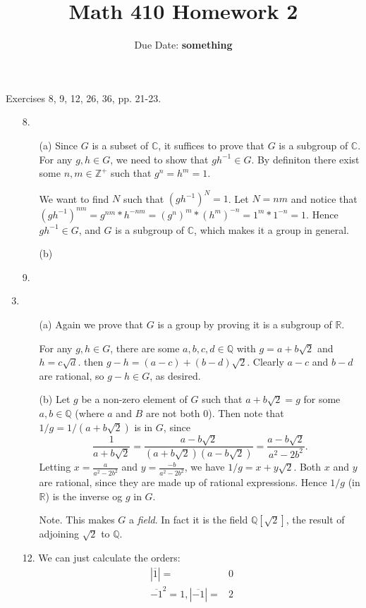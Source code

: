 \documentclass{article}
\title{\textbf{Math 410 Homework 2}}
\author{Due Date: \textbf{something}}
\date{}
\begin{document}
\maketitle

Exercises 8, 9, 12, 26, 36, pp. 21-23.

\begin{enumerate}
    \item [8.] 
    \begin{enumerate}
        \item [(a)] Since $G$ is a subset of $\mathbb C$, it suffices to prove that $G$ is a subgroup of $\mathbb C$. For any $g, h \in G$, we need to show that $gh^{-1} \in G$. By definiton there exist some $n, m \in \mathbb Z^+$ such that $g^n = h^m = 1$. 
        
        We want to find $N$ such that $(gh^{-1})^N = 1$. Let $N = nm$ and notice that $(gh^{-1})^{nm} = g^{nm} * h^{-nm} = (g^n)^m * (h^m)^{-n} = 1^m * 1 ^{-n} = 1$. Hence $gh^{-1} \in G$, and $G$ is a subgroup of $\mathbb C$, which makes it a group in general.
        \item [(b)] 
    \end{enumerate}

    \item [9.]
    \item \begin{enumerate}
        \item [(a)] Again we prove that $G$ is a group by proving it is a subgroup of $\mathbb R$. 
        
        For any $g, h \in G$, there are some $a, b, c, d \in \mathbb Q$ with $g = a + b \sqrt 2$ and $h = c \sqrt d$. then $g - h = (a - c) + (b - d)\sqrt 2$. Clearly $a - c$ and $b - d$ are rational, so $g - h \in G$, as desired. 

        \item [(b)] Let $g$ be a non-zero element of $G$ such that $a + b \sqrt 2 = g$ for some $a, b \in \mathbb Q$ (where $a$ and $B$ are not both $0$). Then note that $1 / g = 1 / (a + b \sqrt 2)$ is in $G$, since \[\frac 1 {a + b \sqrt 2} = \frac {a - b\sqrt 2} {(a + b \sqrt 2) (a - b \sqrt 2)} = \frac {a - b \sqrt 2} {a^2 - 2b^2}.\] Letting $x = \frac a {a^2 - 2b^2}$ and $y = \frac {-b} {a^2 - 2b^2}$, we have $1 / g = x + y \sqrt 2$. 
        Both $x$ and $y$ are rational, since they are made up of rational expressions. Hence $1 / g$ (in $\mathbb R$) is the inverse og $g$ in $G$. 

        \item[Note.] This makes $G$ a \textit{field}. In fact it is the field $\mathbb Q[\sqrt 2]$, the result of adjoining $\sqrt 2$ to $\mathbb Q$. 
    \end{enumerate}
    
    \item [12.] We can just calculate the orders:
    \begin{align*}    
        |\overline{1}| =& 0 \\
        \overline{-1}^2 = 1, |\overline {-1}| =& 2       
    \end{align*}
    
\end{enumerate}
\end{document}
